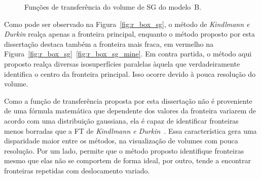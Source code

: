 \begin{figure}[h]
	\centering
	\caption{Funções de transferência do volume de SG do modelo~B.}
	\label{fig:r_box_sg_ft}
\end{figure}

	Como pode ser observado na Figura~\ref{fig:r_box_sg}, o método de \textit{Kindlmann e Durkin} realça apenas a fronteira principal, enquanto o método proposto por esta dissertação destaca também a fronteira mais fraca, em vermelho na Figura~\ref{fig:r_box_sg}~\ref{fig:r_box_sg_mine}. Em contra partida, o método aqui proposto realça diversas isosuperfícies paralelas àquela que verdadeiramente identifica o centro da fronteira principal. Isso ocorre devido à pouca resolução do volume.
	
	Como a função de transferência proposta por esta dissertação não é proveniente de uma fórmula matemática que dependente dos valores da fronteira variarem de acordo com uma distribuição gaussiana, ela é capaz de identificar fronteiras menos borradas que a FT de \textit{Kindlmann e Durkin}~\cite{gordon}. Essa característica gera uma disparidade maior entre os métodos, na visualização de volumes com pouca resolução. Por um lado, permite que o método proposto identifique fronteiras mesmo que elas não se comportem de forma ideal, por outro, tende a encontrar fronteiras repetidas com deslocamento variado.

